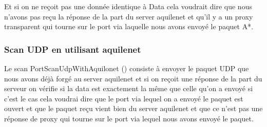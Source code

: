 \documentclass[12pt,a4paper]{article}
\begin{document}
Et si on ne reçoit pas une donnée identique à Data cela voudrait dire que nous n’avons pas reçu la réponse de la part du server aquilenet  et qu’il y a un proxy transparent qui tourne sur le port via laquelle nous avons envoyé le paquet A*.\\
\subsubsection{Scan UDP en utilisant aquilenet}
Le scan PortScanUdpWithAquilonet () consiste à envoyer le paquet UDP que nous avons déjà forgé au server aquilenet et si on reçoit une réponse de la part du serveur on vérifie si la data est exactement la même que celle qu’on a envoyé si c’est le cas cela voudrai dire que le port via lequel on a envoyé le paquet est ouvert et que le  paquet reçu vient bien du server aquilenet et que ce n’est pas une réponse de proxy qui tourne sur le port via lequel nous avons envoyé le paquet.\\
\end{document}
